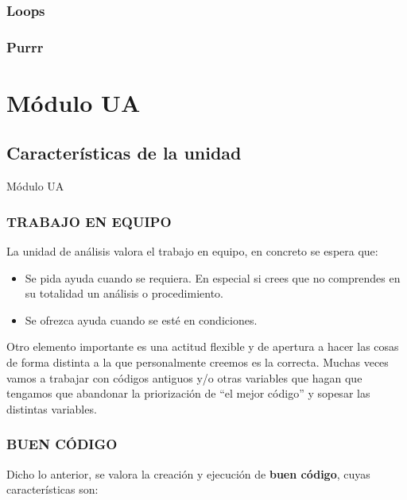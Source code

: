 \documentclass[
  letterpaper,
  DIV=11,
  numbers=noendperiod]{scrreprt}
\begin{document}
\section{Loops}\label{loops}

\section{Purrr}\label{purrr}

\part{Módulo UA}

\chapter{Características de la
unidad}\label{caracteruxedsticas-de-la-unidad}

Módulo UA

\hfill\break

\section{TRABAJO EN EQUIPO}\label{trabajo-en-equipo}

La unidad de análisis valora el trabajo en equipo, en concreto se espera
que:

\begin{itemize}
\item
  Se pida ayuda cuando se requiera. En especial si crees que no
  comprendes en su totalidad un análisis o procedimiento.
\item
  Se ofrezca ayuda cuando se esté en condiciones.
\end{itemize}

Otro elemento importante es una actitud flexible y de apertura a hacer
las cosas de forma distinta a la que personalmente creemos es la
correcta. Muchas veces vamos a trabajar con códigos antiguos y/o otras
variables que hagan que tengamos que abandonar la priorización de ``el
mejor código'' y sopesar las distintas variables.

\section{BUEN CÓDIGO}\label{buen-cuxf3digo}

Dicho lo anterior, se valora la creación y ejecución de \textbf{buen
código}, cuyas características son:
\end{document}
